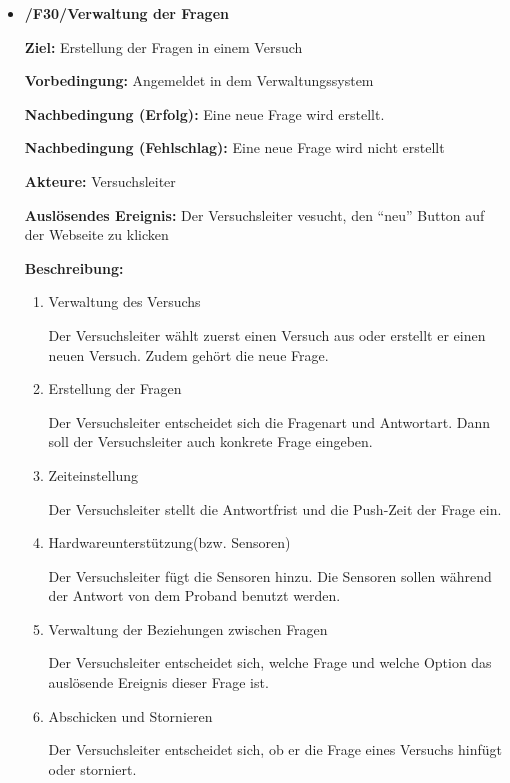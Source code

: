 \documentclass[a4paper]{scrreprt}
\begin{document}
\begin{itemize}
                \item \textbf{/F30/Verwaltung der Fragen }
                \par \textbf{Ziel: }Erstellung der Fragen in einem Versuch
                \par \textbf{Vorbedingung: } Angemeldet in dem Verwaltungssystem
                \par \textbf{Nachbedingung (Erfolg): }Eine neue Frage wird erstellt.
                \par \textbf{Nachbedingung (Fehlschlag): }Eine neue Frage wird nicht erstellt
                \par \textbf{Akteure: }Versuchsleiter
                \par \textbf{Auslösendes Ereignis: }Der Versuchsleiter vesucht, den ``neu'' Button auf der Webseite zu klicken
                \par \textbf{Beschreibung: }
                \begin{enumerate}
                    \item Verwaltung des Versuchs
                    \par Der Versuchsleiter wählt zuerst einen Versuch aus oder erstellt er einen neuen Versuch. Zudem gehört die neue Frage.
                    \item Erstellung der Fragen
                    \par Der Versuchsleiter entscheidet sich die Fragenart und Antwortart. Dann soll der Versuchsleiter auch konkrete Frage eingeben.
                    \item Zeiteinstellung
                    \par Der Versuchsleiter stellt die Antwortfrist und die Push-Zeit der Frage ein.
                    \item Hardwareunterstützung(bzw. Sensoren)
                    \par Der Versuchsleiter fügt die Sensoren hinzu. Die Sensoren sollen während der Antwort von dem Proband benutzt werden.
                    \item Verwaltung der Beziehungen zwischen Fragen
                    \par Der Versuchsleiter entscheidet sich, welche Frage und welche Option das auslösende Ereignis dieser Frage ist.
                    \item Abschicken und Stornieren
                    \par Der Versuchsleiter entscheidet sich, ob er die Frage eines Versuchs hinfügt oder storniert.

\end{enumerate}
\end{itemize}
\end{document}
